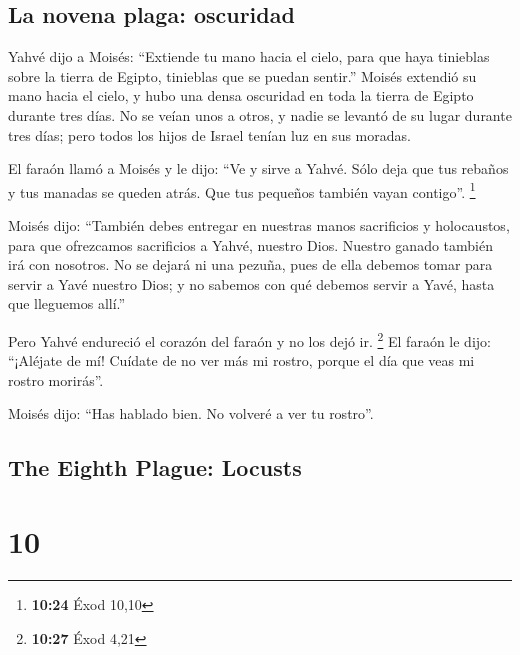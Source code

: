 \begin{paracol}{2}
\hypertarget{la-novena-plaga-oscuridad}{%
\subsection{La novena plaga:
oscuridad}\label{la-novena-plaga-oscuridad}}

 Yahvé dijo a Moisés: ``Extiende tu mano hacia el cielo,
para que haya tinieblas sobre la tierra de Egipto, tinieblas que se
puedan sentir.''  Moisés extendió su mano hacia el cielo,
y hubo una densa oscuridad en toda la tierra de Egipto durante tres
días.  No se veían unos a otros, y nadie se levantó de su
lugar durante tres días; pero todos los hijos de Israel tenían luz en
sus moradas.

 El faraón llamó a Moisés y le dijo: ``Ve y sirve a
Yahvé. Sólo deja que tus rebaños y tus manadas se queden atrás. Que tus
pequeños también vayan contigo''. \footnote{\textbf{10:24} Éxod 10,10}

 Moisés dijo: ``También debes entregar en nuestras manos
sacrificios y holocaustos, para que ofrezcamos sacrificios a Yahvé,
nuestro Dios.  Nuestro ganado también irá con nosotros.
No se dejará ni una pezuña, pues de ella debemos tomar para servir a
Yavé nuestro Dios; y no sabemos con qué debemos servir a Yavé, hasta que
lleguemos allí.''

 Pero Yahvé endureció el corazón del faraón y no los dejó
ir. \footnote{\textbf{10:27} Éxod 4,21}  El faraón le
dijo: ``¡Aléjate de mí! Cuídate de no ver más mi rostro, porque el día
que veas mi rostro morirás''.

 Moisés dijo: ``Has hablado bien. No volveré a ver tu
rostro''.

\switchcolumn
\begin{otherlanguage}{english}

\hypertarget{the-eighth-plague-locusts}{%
\subsection{The Eighth Plague:
Locusts}\label{the-eighth-plague-locusts}}

\hypertarget{section-19}{%
\section{10}\label{section-19}}


\end{otherlanguage}
\end{paracol}
